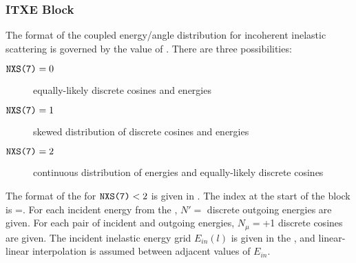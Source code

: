 \subsubsection{\textsf{ITXE} Block}\label{sec:ITXEBlock}

The format of the coupled energy/angle distribution for incoherent inelastic scattering is governed by the value of . There are three possibilities:
\begin{description}
  \item[$\texttt{NXS(7)}=0$] equally-likely discrete cosines and energies
  \item[$\texttt{NXS(7)}=1$] skewed distribution of discrete cosines and energies
  \item[$\texttt{NXS(7)}=2$] continuous distribution of energies and equally-likely discrete cosines
\end{description}

The format of the  for $\texttt{NXS(7)}<2$ is given in . The index at the start of the block is =. For each incident energy from the , $N'=$ discrete outgoing energies are given. For each pair of incident and outgoing energies, $N_\mu=$+1 discrete cosines are given. The incident inelastic energy grid $E_{in}(l)$ is given in the , and linear-linear interpolation is assumed between adjacent values of $E_{in}$.

